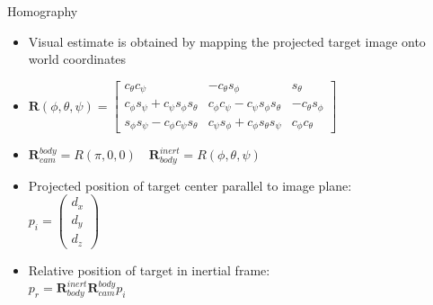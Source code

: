 \documentclass[]{beamer}
\begin{document}
\begin{frame}{Homography}
    \begin{itemize}
        \item \alert{Visual estimate is obtained by mapping the projected target image onto world coordinates}
        \item \alert<+>{
            \begin{math}
                \bm{R}(\phi,\theta,\psi) = 
                \begin{bmatrix}
                    c_{\theta}c_{\psi}                           & -c_{\theta}s_{\phi}                           & s_{\theta}\\
                    c_{\phi}s_{\psi} + c_{\psi}s_{\phi}s_{\theta} & c_{\phi}c_{\psi} - c_{\psi}s_{\phi}s_{\theta} & -c_{\theta}s_{\phi}\\
                    s_{\phi}s_{\psi} -c_{\phi}c_{\psi}s_{\theta} & c_{\psi}s_{\phi} + c_{\phi}s_{\theta}s_{\psi} & c_{\phi}c_{\theta}
                \end{bmatrix}
            \end{math} }
        \item \alert<+>{
            \begin{math}
                \bm{R}_{cam}^{body}    = R(\pi, 0, 0)\quad
                \bm{R}_{body}^{inert}  = R(\phi, \theta, \psi)
            \end{math} }
        \item \alert<+>{Projected position of target center parallel to image plane:\\
            \begin{math}
            p_i = \begin{pmatrix}d_x\\d_y\\d_z\end{pmatrix}
            \end{math} }
        \item \alert<+>{Relative position of target in inertial frame:\\
            \begin{math}
                p_r = \bm{R}_{body}^{inert}\bm{R}_{cam}^{body}p_i
            \end{math} }
    \end{itemize}
\end{frame}
\end{document}
